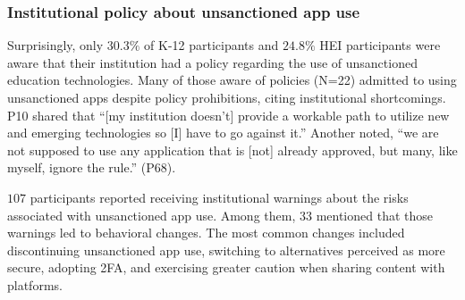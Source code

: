 
\subsubsection{Institutional policy about unsanctioned app use}
\label{inst_policy_on_unsanction_app_use}

Surprisingly, only $30.3\%$ of K-12 participants and $24.8\%$ HEI participants were aware that their institution had a policy regarding the use of unsanctioned education technologies. 
Many of those aware of policies (N=22) admitted to using unsanctioned apps despite policy prohibitions, citing institutional shortcomings.
P10 shared that ``[my institution doesn’t] provide a workable path to utilize new and emerging technologies so [I] have to go against it.'' 
Another noted, ``we are not supposed to use any application that is [not] already approved, but many, like myself, ignore the rule.'' (P68).

$107$ participants reported receiving institutional warnings about the risks associated with unsanctioned app use. 
Among them, $33$ mentioned that those warnings led to behavioral changes.
The most common changes included discontinuing unsanctioned app use, switching to alternatives perceived as more secure, adopting 2FA, and exercising greater caution when sharing content with platforms. 



